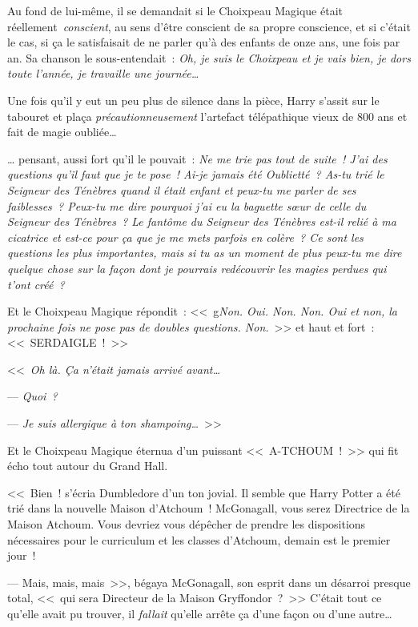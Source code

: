 \later

Au fond de lui-même, il se demandait si le Choixpeau Magique était réellement~\emph{conscient}, au sens d'être conscient de sa propre conscience, et si c'était le cas, si ça le satisfaisait de ne parler qu'à des enfants de onze ans, une fois par an. Sa chanson le sous-entendait~: \emph{Oh, je suis le Choixpeau et je vais bien, je dors toute l'année, je travaille une journée…}

Une fois qu'il y eut un peu plus de silence dans la pièce, Harry s'assit sur le tabouret et plaça \emph{précautionneusement} l'artefact télépathique vieux de 800 ans et fait de magie oubliée…

… pensant, aussi fort qu'il le pouvait~: \emph{Ne me trie pas tout de suite~! J'ai des questions qu'il faut que je te pose~! Ai-je jamais été Oublietté~? As-tu trié le Seigneur des Ténèbres quand il était enfant et peux-tu me parler de ses faiblesses~? Peux-tu me dire pourquoi j'ai eu la baguette sœur de celle du Seigneur des Ténèbres~? Le fantôme du Seigneur des Ténèbres est-il relié à ma cicatrice et est-ce pour ça que je me mets parfois en colère~? Ce sont les questions les plus importantes, mais si tu as un moment de plus peux-tu me dire quelque chose sur la façon dont je pourrais redécouvrir les magies perdues qui t'ont créé~?}

Et le Choixpeau Magique répondit~: <<~g\emph{Non. Oui. Non. Non. Oui et non, la prochaine fois ne pose pas de doubles questions. Non.}~>> et haut et fort~: <<~SERDAIGLE~!~>>

\later

<<~\emph{Oh là. Ça n'était jamais arrivé avant…}

--- \emph{Quoi~?}

--- \emph{Je suis allergique à ton shampoing…}~>>

Et le Choixpeau Magique éternua d'un puissant <<~A-TCHOUM~!~>> qui fit écho tout autour du Grand Hall.

<<~Bien~! s'écria Dumbledore d'un ton jovial. Il semble que Harry Potter a été trié dans la nouvelle Maison d'Atchoum~! McGonagall, vous serez Directrice de la Maison Atchoum. Vous devriez vous dépêcher de prendre les dispositions nécessaires pour le curriculum et les classes d'Atchoum, demain est le premier jour~!

--- Mais, mais, mais~>>, bégaya McGonagall, son esprit dans un désarroi presque total, <<~qui sera Directeur de la Maison Gryffondor~?~>> C'était tout ce qu'elle avait pu trouver, il \emph{fallait} qu'elle arrête ça d'une façon ou d'une autre…

